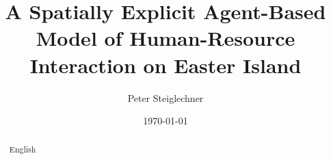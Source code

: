 \documentclass{kththesis}
\title{A Spatially Explicit Agent-Based Model of Human-Resource Interaction on Easter Island}
\author{Peter Steiglechner}
\date{\today}
\begin{document}
\frontmatter
%
\titlepage

\begin{abstract}
	English
\end{abstract}
\begin{otherlanguage}{swedish}
\end{otherlanguage}

\tableofcontents

\mainmatter
%











\printbibliography[heading=bibintoc]

\appendix


\tailmatter
\end{document}
